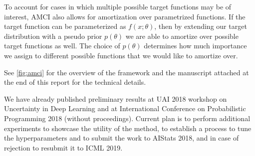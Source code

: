 \documentclass[12pt]{article}
\begin{document}
To account for cases in which multiple possible target functions may be of interest, AMCI also allows for amortization over parametrized functions.
If the target function can be parameterized as $f(x;\theta)$, then by extending our target distribution with a pseudo prior $p(\theta)$ we are able to amortize over possible target functions as well.
The choice of $p(\theta)$ determines how much importance we assign to different possible functions that we would like to amortize over.

See \autoref{fig:amci} for the overview of the framework and
the manuscript attached at the end of this report for the technical details.

We have already published preliminary results at UAI 2018 workshop on Uncertainty in Deep Learning and at International Conference on Probabilistic Programming 2018 (without proceedings).
Current plan is to perform additional experiments to showcase the utility of the method, 
to establish a process to tune the hyperparameters and
to submit the work to AIStats 2018, 
and in case of rejection to resubmit it to ICML 2019.
 
\end{document}

